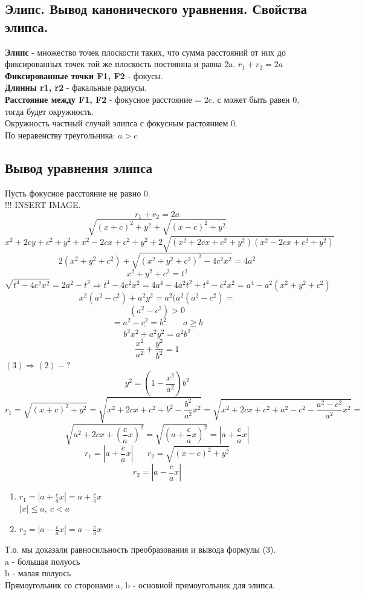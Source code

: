 \documentclass[12pt, a4paper]{article}
\begin{document}
\subsection{Элипс. Вывод канонического уравнения. Свойства элипса.}
\textbf{Элипс} - множество точек плоскости таких, что сумма расстояний от них до фиксированных точек той же плоскость постоянна и равна 2a. $ r_1 + r_2 = 2a $\\
\textbf{Фиксированные точки F1, F2} - фокусы.\\
\textbf{Длинны r1, r2} - факальные радиусы.\\
\textbf{Расстояние между F1, F2} - фокусное расстояние = 2c. с может быть равен 0, тогда будет окружность.\\
Окружность частный случай элипса с фокусным растоянием 0.\\
По неравенству треугольника: $ a > c $

\subsection{Вывод уравнения элипса}
Пусть фокусное расстояние не равно 0.\\
!!! INSERT IMAGE.\\
\begin{equation}
	r_1 + r_2 = 2a
\end{equation}
\begin{equation}	
	\sqrt{ (x + c)^2 + y^2 } + \sqrt{(x - c)^2 + y^2}
\end{equation}
\[	x^2 + 2cy + c^2 + y^2 + x^2 - 2cx + c^2 + y^2  + 2\sqrt{(x^2 + 2cx + c^2 + y^2)(x^2 - 2cx + c^2 + y^2)} \]
\[ 2( x^2 + y^2 + c^2) + \sqrt{(x^2 + y^2 + c^2) ^ 2 - 4c^2x^2} = 4a^2 \]
\[ x^2 + y^2 + c^2 = t^2 \]
\[ \sqrt{t^4 - 4c^2x^2} = 2a^2 - t^2 \Rightarrow t^4 - 4c^2x^2 = 4a^4 - 4a^2t^2 + t^4 - c^2x^2 = a^4 - a^2(x^2 + y^2 + c^2) \]
\[ x^2(a^2 - c^2) + a^2y^2 = a^2(a^2(a^2-c^2) = \]
\[ (a^2 - c^2) > 0 \]
\[ = \underline{a^2 - c^2 = b^2}\;\;\;\;\;\;\; \underline{a  \geq b} \]
\[ b^2x^2 + a^2y^2 = a^2b^2 \]
\begin{equation}
	\frac{x^2}{a^2} + \frac{y^2}{b^2} = 1
\end{equation}
$(3) \Rightarrow (2) - ?$\\
\[ y^2 = (1 - \frac{x^2}{a^2})b^2 \]
\[ r_1 = \sqrt{(x+c)^2 + y^2} = \sqrt{x^2 + 2cx + c^2 + b^2 - \frac{b^2}{a^2}x^2} = \sqrt{x^2 + 2cx + c^2 + a^2 - c^2 - \frac{a^2 - c^2}{a^2}x^2} =\]
\[\sqrt{a^2 + 2cx + (\frac{c}{a}x)^2} = \sqrt{(a + \frac{c}{a}x)^2} = |a + \frac{c}{a}x| \]
\[ r_1 = |a + \frac{c}{a}x| \;\;\;\;\;\; r_2 = \sqrt{(x - c)^2 + y^2} \]
\[ r_2 = |a - \frac{c}{a}x| \]
\begin{enumerate}
	\item $r_1 = |a + \frac{c}{a}x| = a + \frac{c}{a}x$\\
		$|x| \leq a,\ c < a$
	\item $r_2 = |a - \frac{c}{a}x| = a - \frac{c}{a}x$
\end{enumerate}
Т.о. мы доказали равносильность преобразования и вывода формулы (3).\\
a - большая полуось\\
b - малая полуось\\
Прямоугольник со сторонами a, b - основной прямоугольник для элипса.
\end{document}

